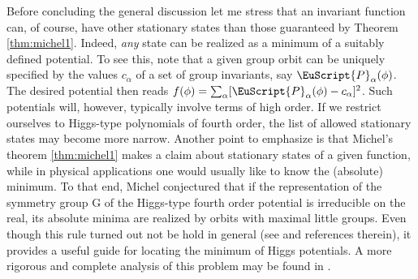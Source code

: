 \documentclass[final,3p,times,12pt,a4paper,sort&compress]{elsarticle}
\newcommand\gr[1]{\mathrm{#1}}              %
\newcommand\PP{\EuScript{P}}                %
\begin{document}
Before concluding the general discussion let me stress that an invariant
function can, of course, have other stationary states than those guaranteed by
Theorem \ref{thm:michel1}. Indeed, \emph{any} state can be realized as a
minimum of a suitably defined potential. To see this, note that a given group
orbit can be uniquely specified by the values $c_\alpha$ of a set of group
invariants, say $\PP_\alpha(\phi)$. The desired potential then reads
$f(\phi)=\sum_\alpha[\PP_\alpha(\phi)-c_\alpha]^2$. Such potentials will,
however, typically involve terms of high order. If we restrict ourselves to
Higgs-type polynomials of fourth order, the list of allowed stationary states
may become more narrow. Another point to emphasize is that Michel's theorem
\ref{thm:michel1} makes a claim about stationary states of a given function,
while in physical applications one would usually like to know the (absolute)
minimum. To that end, Michel conjectured \cite{Michel:1980pc} that if the
representation of the symmetry group $\gr G$ of the Higgs-type fourth order
potential is irreducible on the real, its absolute minima are realized by orbits
with maximal little groups. Even though this rule turned out not be hold in
general (see \cite{Slansky:1981yr,Meljanac:1985br} and references therein), it
provides a useful guide for locating the minimum of Higgs potentials. A more
rigorous and complete analysis of this problem may be found in
\cite{Abud:1983id}.
\end{document}
